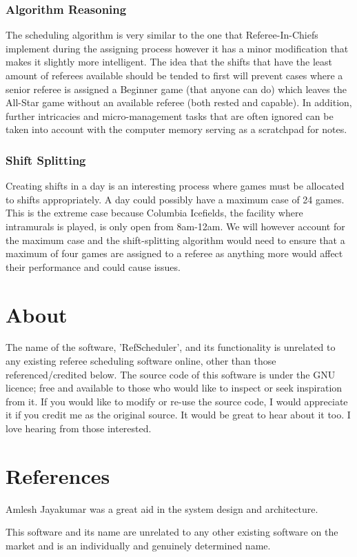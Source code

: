 \documentclass{article}
\begin{document}
\subsubsection{Algorithm Reasoning}
The scheduling algorithm is very similar to the one that Referee-In-Chiefs implement during the assigning process however it has a minor modification that makes it slightly more intelligent. The idea that the shifts that have the least amount of referees available should be tended to first will prevent cases where a senior referee is assigned a Beginner game (that anyone can do) which leaves the All-Star game without an available referee (both rested and capable). In addition, further intricacies and micro-management tasks that are often ignored can be taken into account with the computer memory serving as a scratchpad for notes.
\subsubsection{Shift Splitting}
Creating shifts in a day is an interesting process where games must be allocated to shifts appropriately. A day could possibly have a maximum case of 24 games. This is the extreme case because Columbia Icefields, the facility where intramurals is played, is only open from 8am-12am. We will however account for the maximum case and the shift-splitting algorithm would need to ensure that a maximum of four games are assigned to a referee as anything more would affect their performance and could cause issues.

\section{About}
The name of the software, 'RefScheduler', and its functionality is unrelated to any existing referee scheduling software online, other than those referenced/credited below. The source code of this software is under the GNU licence; free and available to those who would like to inspect or seek inspiration from it. If you would like to modify or re-use the source code, I would appreciate it if you credit me as the original source. It would be great to hear about it too. I love hearing from those interested.

\section{References}
Amlesh Jayakumar was a great aid in the system design and architecture.

This software and its name are unrelated to any other existing software on the market and is an individually and genuinely determined name.
\end{document}
